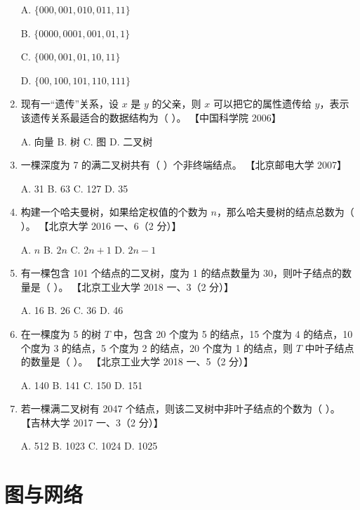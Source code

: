 \documentclass[lang=cn,newtx,10pt,scheme=chinese]{elegantbook}
\begin{document}
\begin{enumerate}
    A. $\{000, 001, 010, 011, 11\}$  

    B. $\{0000, 0001, 001, 01, 1\}$  

    C. $\{000, 001, 01, 10, 11\}$  

    D. $\{00, 100, 101, 110, 111\}$  

    \item 现有一“遗传”关系，设 $x$ 是 $y$ 的父亲，则 $x$ 可以把它的属性遗传给 $y$，表示该遗传关系最适合的数据结构为（ ）。  
    【中国科学院 2006】  

    A. 向量 \quad B. 树 \quad C. 图 \quad D. 二叉树  

    \item 一棵深度为 7 的满二叉树共有（ ）个非终端结点。  
    【北京邮电大学 2007】  

    A. 31 \quad B. 63 \quad C. 127 \quad D. 35  

    \item 构建一个哈夫曼树，如果给定权值的个数为 $n$，那么哈夫曼树的结点总数为（ ）。  
    【北京大学 2016 一、6（2 分）】

    A. $n$ \quad B. $2n$ \quad C. $2n + 1$ \quad D. $2n - 1$  

    \item 有一棵包含 101 个结点的二叉树，度为 1 的结点数量为 30，则叶子结点的数量是（ ）。  
    【北京工业大学 2018 一、3（2 分）】 

    A. 16 \quad B. 26 \quad C. 36 \quad D. 46  

    \item 在一棵度为 5 的树 $T$ 中，包含 20 个度为 5 的结点，15 个度为 4 的结点，10 个度为 3 的结点，5 个度为 2 的结点，20 个度为 1 的结点，则 $T$ 中叶子结点的数量是（ ）。  
    【北京工业大学 2018 一、5（2 分）】 

    A. 140 \quad B. 141 \quad C. 150 \quad D. 151  

    \item 若一棵满二叉树有 2047 个结点，则该二叉树中非叶子结点的个数为（ ）。  
    【吉林大学 2017 一、3（2 分）】

    A. 512 \quad B. 1023 \quad C. 1024 \quad D. 1025 



\end{enumerate}


\chapter{图与网络}
\end{document}
